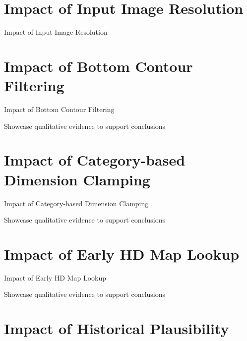 \section{Impact of Input Image Resolution}
\label{sec:impactresolution}

Impact of Input Image Resolution

\newpage


\section{Impact of Bottom Contour Filtering}
\label{sec:impactcontourfiltering}

Impact of Bottom Contour Filtering

\newpage

Showcase qualitative evidence to support conclusions

\newpage


\section{Impact of Category-based Dimension Clamping}
\label{sec:impactsizefiltering}

Impact of Category-based Dimension Clamping

\newpage

Showcase qualitative evidence to support conclusions

\newpage


\section{Impact of Early HD Map Lookup}
\label{sec:impactearlymap}

Impact of Early HD Map Lookup

\newpage

Showcase qualitative evidence to support conclusions

\newpage


\section{Impact of Historical Plausibility}
\label{sec:impacthistplausibility}

